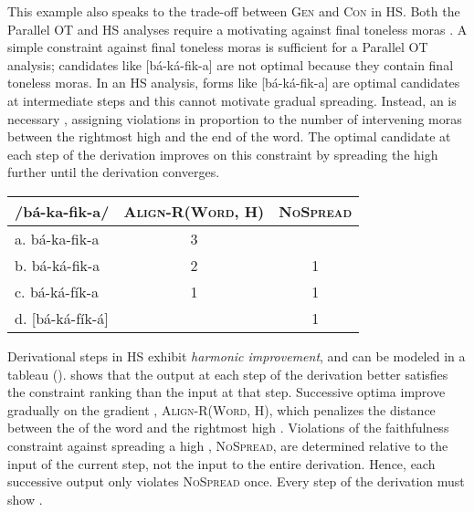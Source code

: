 \documentclass[output=paper,newtxmath,modfonts,nonflat,hidelinks]{langsci/langscibook}
\begin{document}
This example also speaks to the trade-off between \textsc{Gen} and \textsc{Con} in HS. Both the Parallel OT and HS analyses require a motivating  against final toneless moras \citep{kulabickmore2015}. A simple constraint against final toneless  moras is sufficient for a Parallel OT analysis; candidates like [{bá-ká-fik-a}] are not optimal because they contain final toneless moras. In an HS analysis, forms like [{{bá-ká-fik-a}}] are optimal candidates at intermediate steps and this  cannot motivate gradual spreading. Instead, an  is necessary \citep{mccarthyprince1993}, assigning violations in proportion to the number of intervening moras between the rightmost high  and the end of the word. The optimal candidate at each step of the derivation improves on this constraint by spreading the high  further until the derivation converges.


\begin{tableau}[b]
    \begin{tabular}{|l||c|c|} \hline
    /{bá-ka-fik-a}/ &
    	\textsc{Align-R(Word, H)} &
        \textsc{NoSpread} \\
    \hline \hline
    a. {bá-ka-fik-a}         & 3 &   \\ \hline
    b. {bá-ká-fik-a}       & 2 & 1 \\ \hline
    c. {bá-ká-fík-a}     & 1 & 1 \\ \hline
    d. [{bá-ká-fík-á}] &   & 1 \\ \hline
    \end{tabular}
\end{tableau}

  
Derivational steps in HS exhibit \textit{harmonic improvement}, and can be modeled in a  tableau ().  shows that the output at each step of the derivation better satisfies the constraint ranking than the input at that step. Successive optima improve gradually on the gradient , \textsc{Align-R(Word, H)}, which penalizes the distance between the  of the word and the rightmost high . Violations of the faithfulness constraint against spreading a high , \textsc{NoSpread}, are determined relative to the input of the current step, not the input to the entire derivation. Hence, each successive output only violates \textsc{NoSpread} once. Every step of the derivation must show .
\end{document}
